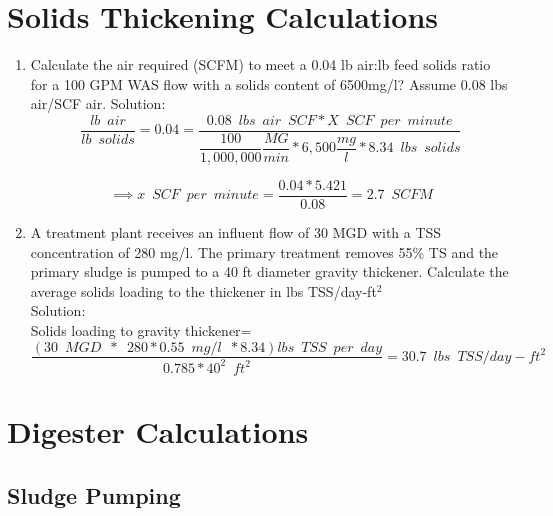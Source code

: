 \begin{enumerate}
\end{enumerate}








\section{Solids Thickening Calculations} 

\begin{enumerate}
\item Calculate the air required (SCFM) to meet a 0.04 lb air:lb feed solids ratio for a 100 GPM WAS flow
with a solids content of 6500mg/l? Assume 0.08 lbs air/SCF air.
Solution:
$$\dfrac{lb \enspace air}{lb \enspace solids}=0.04=\dfrac{0.08 \enspace lbs \enspace air \enspace SCF * X \enspace SCF \enspace per \enspace minute}{\dfrac{100}{1,000,000}\dfrac{MG}{min}*6,500\dfrac{mg}{l}*8.34 \enspace lbs \enspace solids}$$

$$\implies x \enspace SCF \enspace per \enspace minute = \dfrac{0.04*5.421}{0.08}=\boxed{2.7 \enspace SCFM}$$

\item A treatment plant receives an influent flow of 30 MGD with a TSS concentration of 280 mg/l.  The primary treatment removes 55\% TS and the primary sludge is pumped to a 40 ft diameter gravity thickener.  Calculate the average solids loading to the thickener in lbs TSS/day-ft$^2$\\
Solution:\\
 
Solids loading to gravity thickener=$\dfrac{(30 \enspace MGD \enspace * \enspace 280*0.55 \enspace mg/l \enspace *8.34) lbs \enspace TSS \enspace per  \enspace day}{0.785*40^2 \enspace ft^2}=\boxed{30.7 \enspace lbs \enspace TSS/day-ft^2}$

\end{enumerate}



\section{Digester Calculations}
\subsection{Sludge Pumping}
			
